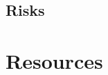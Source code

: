 \documentclass[11pt,a4paper]{article}
\begin{document}

\label{sec:ProjectPlanning}




\subsection{Risks}


\section{Resources}

\end{document}
